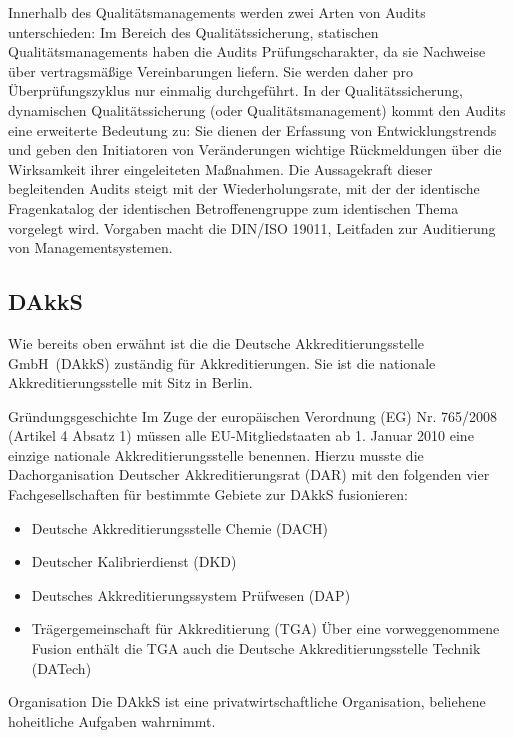 Innerhalb des Qualitätsmanagements werden zwei Arten von Audits unterschieden: Im Bereich des Qualitätssicherung, statischen Qualitätsmanagements haben die Audits Prüfungscharakter, da sie  Nachweise über vertragsmäßige Vereinbarungen liefern. Sie werden daher pro Über\-prüfungs\-zyklus nur einmalig durchgeführt. In der Qualitätssicherung, dynamischen Qualitäts\-sicherung (oder Qualitätsmanagement) kommt den Audits eine erweiterte Bedeutung zu: Sie dienen der Erfassung von Entwicklungstrends und geben den Initiatoren von Veränderungen wichtige Rückmeldungen über die Wirksamkeit ihrer eingeleiteten Maßnahmen. Die Aussagekraft dieser begleitenden Audits steigt mit der Wiederholungsrate, mit der der identische Fragenkatalog der identischen Betroffenengruppe zum identischen Thema vorgelegt wird. Vorgaben macht die \glqq DIN/ISO 19011, Leitfaden zur Auditierung von Managementsystemen\grqq.

\subsection{DAkkS}
Wie bereits oben erwähnt ist die 
die \glqq Deutsche Akkreditierungsstelle GmbH\grqq ~(\glqq DAkkS\grqq) zuständig für Akkreditierungen. Sie ist die nationale Akkreditierungsstelle mit Sitz in Berlin.

Gründungsgeschichte \newline
Im Zuge der europäischen Verordnung (EG) Nr. 765/2008 (Artikel 4 Absatz 1) müssen alle EU-Mitgliedstaaten ab 1. Januar 2010 eine einzige nationale Akkreditierungsstelle benennen. Hierzu musste die Dachorganisation Deutscher Akkreditierungsrat (DAR) mit den folgenden vier Fachgesellschaften für bestimmte Gebiete zur DAkkS fusionieren:
\begin{itemize}
\item Deutsche Akkreditierungsstelle Chemie (DACH)
\item Deutscher Kalibrierdienst (DKD)
\item Deutsches Akkreditierungssystem Prüfwesen (DAP)
\item Trägergemeinschaft für Akkreditierung (TGA)
Über eine vorweggenommene Fusion enthält die TGA auch die Deutsche Akkreditierungsstelle Technik (DATech)
\end{itemize}
Organisation \newline
Die DAkkS ist eine privatwirtschaftliche Organisation, beliehene hoheitliche Aufgaben wahrnimmt. 

